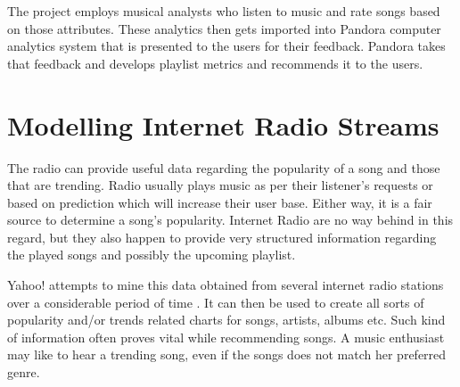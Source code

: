 			 The project employs musical analysts who listen to music and rate songs based on those attributes. These analytics then gets imported into Pandora computer analytics system that is presented to the users for their feedback. Pandora takes that feedback and develops playlist metrics and recommends it to the users.
		

	\section{Modelling Internet Radio Streams}
	\label{sec:modelling_internet_radio}
		The radio can provide useful data regarding the popularity of a song and those that are trending. Radio usually plays music as per their listener's requests or based on prediction which will increase their user base. Either way, it is a fair source to determine a song's popularity. Internet Radio are no way behind in this regard, but they also happen to provide very structured information regarding the played songs and possibly the upcoming playlist.
		
		Yahoo! attempts to mine this data obtained from several internet radio stations over a considerable period of time \cite{aizenberg2012build}. It can then be used to create all sorts of popularity and/or trends related charts for songs, artists, albums etc. Such kind of information often proves vital while recommending songs. A music enthusiast may like to hear a trending song, even if the songs does not match her preferred genre.
